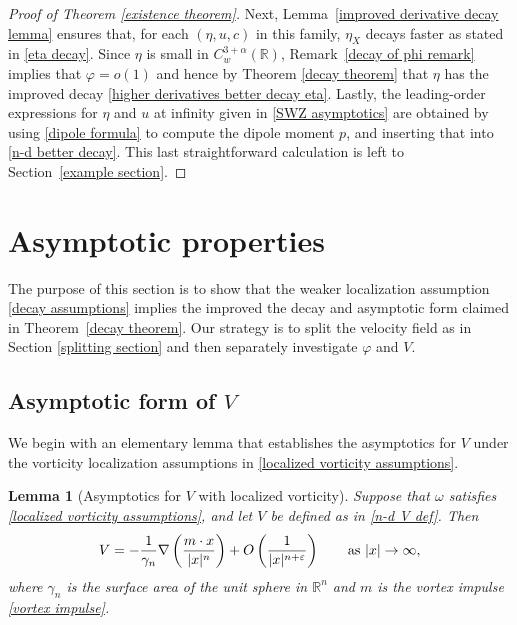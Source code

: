 \documentclass[11pt,reqno]{amsart}
\newcommand{\R}{\mathbb{R}}
\newcommand{\abs}[2][]{#1\lvert #2 #1\rvert}
\theoremstyle{plain}
\newtheorem{lemma}[theorem]{Lemma}
\theoremstyle{remark}
\numberwithin{equation}{section}
\begin{document}
\begin{proof}[Proof of Theorem \ref{existence theorem}]
   
   Next, Lemma~\ref{improved derivative decay lemma} ensures that, for each $(\eta,u,c)$ in this family, $\eta_X$ decays faster as stated in \eqref{eta decay}.  Since $\eta$ is small in $C^{3+\alpha}_w(\R)$, Remark~\ref{decay of phi remark} implies that $\varphi = o(1)$ and hence by Theorem \ref{decay theorem} that $\eta$ has the improved decay \eqref{higher derivatives better decay eta}. Lastly, the leading-order expressions for $\eta$ and $u$ at infinity given in  \eqref{SWZ asymptotics} are obtained by using \eqref{dipole formula} to compute the dipole moment $p$, and inserting that into \eqref{n-d better decay}.  This last straightforward calculation is left to Section~\ref{example section}.  
\end{proof}



\section{Asymptotic properties}

The purpose of this section is to show that the weaker localization assumption \eqref{decay assumptions} implies the improved the decay and asymptotic form claimed in Theorem~\ref{decay theorem}. Our strategy is to split the velocity field as in Section \ref{splitting section} and then separately investigate $\varphi$ and $V$. 



\subsection{Asymptotic form of \texorpdfstring{$V$}{V}}
We begin with an elementary lemma that establishes the asymptotics for $V$ under the vorticity localization assumptions in \eqref{localized vorticity assumptions}.  

\begin{lemma}[Asymptotics for $V$ with localized vorticity] \label{V asymptotics lemma} 
Suppose that $\omega$ satisfies \eqref{localized vorticity assumptions}, and let $V$ be defined as in \eqref{n-d V def}. Then 
\begin{equation}
  \label{V asymptotics}
  V = -{1\over \gamma_n}\nabla \left( \frac{m \cdot x}{|x|^n} \right) + O\left( {1\over |x|^{n+\varepsilon}} \right)
  \qquad 
  \text{as $\abs x \to \infty$},
\end{equation}
where $\gamma_n$ is the surface area of the unit sphere in $\R^n$ and $m$ is the vortex impulse \eqref{vortex impulse}.
\end{lemma}
\end{document}
